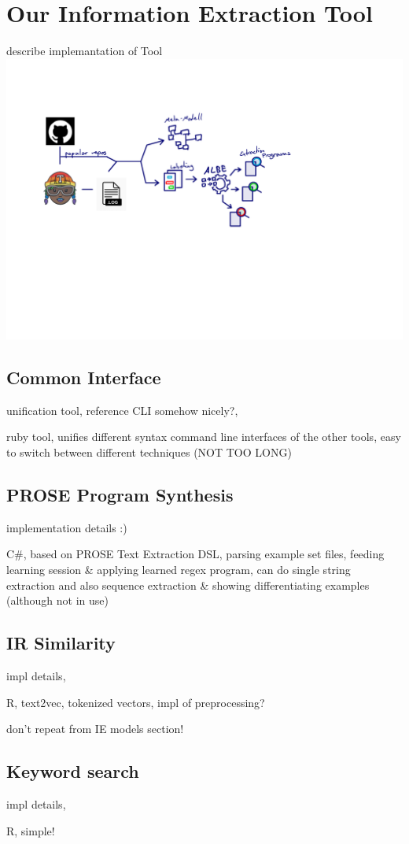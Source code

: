 \documentclass[\myrootdir/main.tex]{subfiles}
\begin{document}
\chapter{Our Information Extraction Tool}
\label{implementation}
describe implemantation of Tool
\includegraphics[page=7, width=\textwidth, trim={0.5cm 0.5cm 0.5cm 0.5cm}, clip]{img/flow-of-research.pdf}

\section{Common Interface} 
unification tool, reference CLI somehow nicely?,

ruby tool, unifies different syntax command line interfaces of the other tools, easy to switch between different techniques (NOT TOO LONG)

\section{PROSE Program Synthesis}
implementation details :)

C\#, based on PROSE Text Extraction DSL, parsing example set files, feeding learning session \& applying learned regex program, can do single string extraction and also sequence extraction \& showing differentiating examples (although not in use)

\section{IR Similarity}
impl details,

R, text2vec, tokenized vectors, impl of preprocessing?

don't repeat from IE models section!

\section{Keyword search}
impl details,

R, simple!
\end{document}
